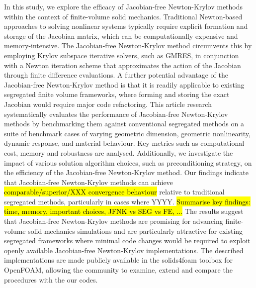 \documentclass[sn-mathphys,Numbered]{sn-jnl}%
\begin{document}
\abstract
{
In this study, we explore the efficacy of Jacobian-free Newton-Krylov methods within the context of finite-volume solid mechanics.
Traditional Newton-based approaches to solving nonlinear systems typically require explicit formation and storage of the Jacobian matrix, which can be computationally expensive and memory-intensive.
The Jacobian-free Newton-Krylov method circumvents this by employing Krylov subspace iterative solvers, such as GMRES, in conjunction with a Newton iteration scheme that approximates the action of the Jacobian through finite difference evaluations.
A further potential advantage of the Jacobian-free Newton-Krylov method is that it is readily applicable to existing segregated finite volume frameworks, where forming and storing the exact Jacobian would require major code refactoring.
This article research systematically evaluates the performance of Jacobian-free Newton-Krylov methods by benchmarking them against conventional segregated methods on a suite of benchmark cases of varying geometric dimension, geometric nonlinearity, dynamic response, and material behaviour.
Key metrics such as computational cost, memory and robustness are analysed.
Additionally, we investigate the impact of various solution algorithm choices, such as preconditioning strategy, on the efficiency of the Jacobian-free Newton-Krylov method.
Our findings indicate that Jacobian-free Newton-Krylov methods can achieve \hl{comparable/superior/XXX convergence behaviour} relative to traditional segregated methods, particularly in cases where YYYY.
\hl{Summarise key findings: time, memory, important choices, JFNK vs SEG vs FE, ...}
The results suggest that Jacobian-free Newton-Krylov methods are promising for advancing finite-volume solid mechanics simulations and are particularly attractive for existing segregated frameworks where minimal code changes would be required to exploit openly available Jacobian-free Newton-Krylov implementations.
The described implementations are made publicly available in the solids4foam toolbox for OpenFOAM, allowing the community to examine, extend and compare the procedures with the our codes.
}
\end{document}
